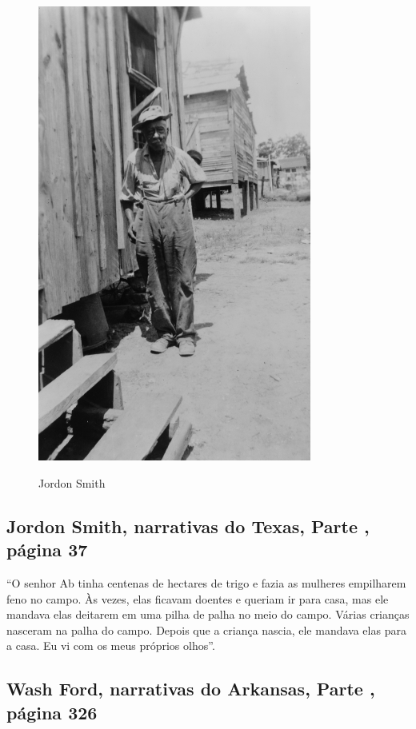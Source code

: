 \begin{figure}[]
\centering
 \includegraphics[width=90mm]{./imgs/jordonsmith_recorte.jpg} \label{img2}
\caption{Jordon Smith}
\end{figure}

\subsection{Jordon Smith, narrativas do Texas, Parte , página 37}
\label{ref244}

``O senhor Ab tinha centenas de hectares de trigo e fazia as mulheres
empilharem feno no campo. Às vezes, elas ficavam doentes e queriam ir
para casa, mas ele mandava elas deitarem em uma pilha de palha no meio
do campo. Várias crianças nasceram na palha do campo. Depois que a
criança nascia, ele mandava elas para a casa. Eu vi com os meus próprios
olhos''.

\subsection{Wash Ford, narrativas do Arkansas, Parte , página 326} \label{ref92}

